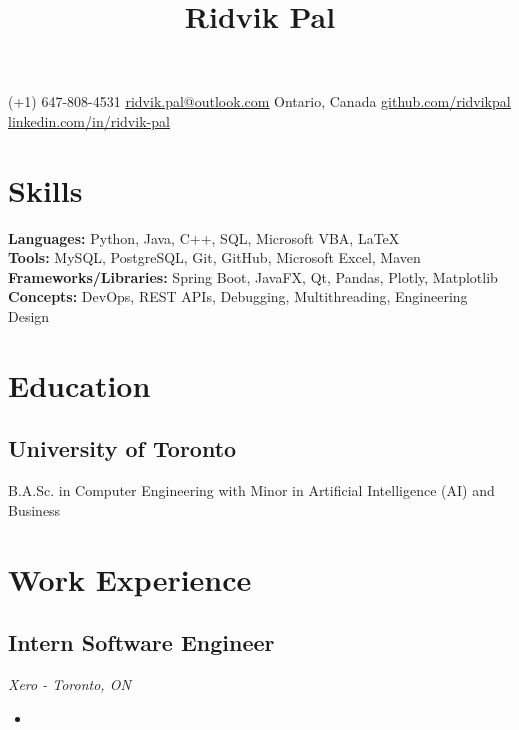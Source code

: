 \documentclass{article}
\begin{document}
\title{\vspace{-1.5cm}\textbf{Ridvik Pal}\vspace{-1.5cm}}
\date{}
\maketitle
\begin{center}
    (+1) 647-808-4531
    \hfill
    \href{mailto:ridvik.pal@outlook.com}{\underline{ridvik.pal@outlook.com}}
    \hfill
    Ontario, Canada
    \hfill
    \href{https://github.com/ridvikpal}{\underline{github.com/ridvikpal}}
    \hfill
    \href{https://www.linkedin.com/in/ridvik-pal}{\underline{linkedin.com/in/ridvik-pal}}
\end{center}

\section*{Skills}
\textbf{Languages:} Python, Java, C++, SQL, Microsoft VBA, \LaTeX \\
\textbf{Tools:} MySQL, PostgreSQL, Git, GitHub, Microsoft Excel, Maven \\
\textbf{Frameworks/Libraries:} Spring Boot, JavaFX, Qt, Pandas, Plotly, Matplotlib \\
\textbf{Concepts:} DevOps, REST APIs, Debugging, Multithreading, Engineering Design

\section*{Education}
\subsection*{University of Toronto \hfill {}}
B.A.Sc. in Computer Engineering with Minor in Artificial Intelligence (AI) and Business

\section*{Work Experience}
\subsection*{Intern Software Engineer \hfill {}}
\textit{Xero - Toronto, ON}
\begin{itemize}
    \item 
\end{itemize}
\end{document}
